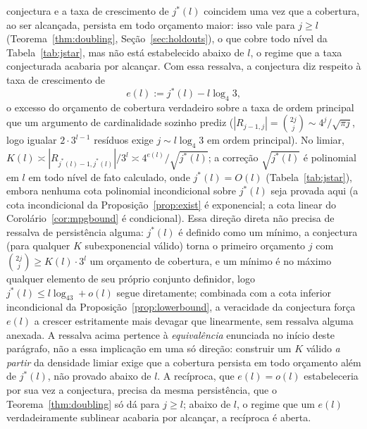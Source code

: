 \documentclass[11pt]{amsart}
\theoremstyle{plain}
\theoremstyle{definition}
\theoremstyle{remark}
\begin{document}
conjectura e a taxa de crescimento de $j^*(l)$ coincidem uma vez que a cobertura, ao ser alcançada,
persista em todo orçamento maior: isso vale para $j\ge l$ (Teorema~\ref{thm:doubling},
Seção~\ref{sec:holdouts}), o que cobre todo nível da Tabela~\ref{tab:jstar}, mas não está
estabelecido abaixo de $l$, o regime que a taxa conjecturada acabaria por alcançar. Com essa
ressalva, a conjectura diz respeito à taxa de crescimento de
\begin{equation}
\label{eq:el}
e(l) := j^*(l) - l\log_4 3,
\end{equation}
o excesso do orçamento de cobertura verdadeiro sobre a taxa de ordem principal que um argumento de
cardinalidade sozinho prediz ($|R_{j-1,j}| = \binom{2j}{j} \sim 4^j/\sqrt{\pi j}$, logo igualar
$2\cdot3^{l-1}$ resíduos exige $j \sim l\log_4 3$ em ordem principal). No limiar,
$K(l) \asymp |R_{j^*(l)-1,j^*(l)}|/3^l \asymp 4^{e(l)}/\sqrt{j^*(l)}$; a correção
$\sqrt{j^*(l)}$ é polinomial em $l$ em todo nível de fato calculado, onde $j^*(l)=O(l)$
(Tabela~\ref{tab:jstar}), embora nenhuma cota polinomial incondicional sobre $j^*(l)$ seja provada
aqui (a cota incondicional da Proposição~\ref{prop:exist} é exponencial; a cota linear do
Corolário~\ref{cor:mpgbound} é condicional). Essa direção direta não precisa de ressalva de
persistência alguma: $j^*(l)$ é definido como um mínimo, a conjectura (para qualquer $K$
subexponencial válido) torna o primeiro orçamento $j$ com $\binom{2j}{j}\ge K(l)\cdot3^l$ um
orçamento de cobertura, e um mínimo é no máximo qualquer elemento de seu próprio conjunto
definidor, logo $j^*(l)\le l\log_43+o(l)$ segue diretamente; combinada com a cota inferior
incondicional da Proposição~\ref{prop:lowerbound}, a veracidade da conjectura força $e(l)$ a
crescer estritamente mais devagar que linearmente, sem ressalva alguma anexada. A ressalva acima
pertence à \emph{equivalência} enunciada no início deste parágrafo, não a essa implicação em uma só
direção: construir um $K$ válido \emph{a partir} da densidade limiar exige que a cobertura persista
em todo orçamento além de $j^*(l)$, não provado abaixo de $l$. A recíproca, que $e(l)=o(l)$
estabeleceria por sua vez a conjectura, precisa da mesma persistência, que o
Teorema~\ref{thm:doubling} só dá para $j\ge l$; abaixo de $l$, o regime que um $e(l)$ verdadeiramente
sublinear acabaria por alcançar, a recíproca é aberta.
\end{document}

